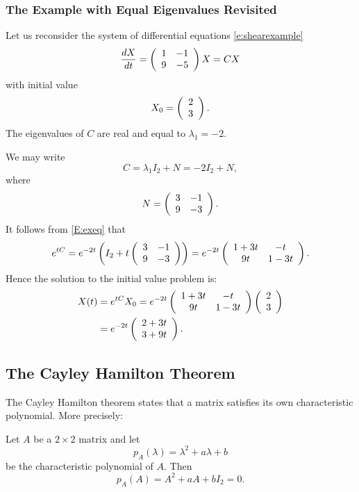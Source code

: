 \documentclass{ximera}
\begin{document}
\subsubsection*{The Example with Equal Eigenvalues Revisited}

Let us reconsider the system of differential equations \eqref{e:shearexample}
\[
\frac{dX}{dt} = \left(\begin{array}{rr} 1 & -1\\ 9 &-5\end{array}\right) X = CX
\]
with initial value
\[
X_0 = \left(\begin{array}{r} 2 \\ 3\end{array}\right).
\]
The eigenvalues of $C$ are real and equal to $\lambda_1=-2$.

We may write
\[
C = \lambda_1 I_2 + N = -2I_2+N,
\]
where
\[
N = \left(\begin{array}{rr} 3 & -1\\ 9 &-3\end{array}\right).
\]
It follows from \eqref{E:exeq} that
\begin{equation}  \label{e:solntob}
e^{tC} =  e^{-2t}\left(I_2+t\left(\begin{array}{rr} 3 & -1\\ 9 &-3\end{array}\right)\right)
= e^{-2t}\left(\begin{array}{cc} 1+3t & -t\\ 9t &1-3t\end{array}\right).
\end{equation}
Hence the solution to the initial value problem is:
\begin{align*}
X(t) &= e^{tC}X_0 = e^{-2t}\left(\begin{array}{cc} 1+3t & -t\\ 9t &1-3t\end{array}\right)\left(\begin{array}{r} 2 \\ 3\end{array}\right) \\
  &= e^{-2t}\left(\begin{array}{r} 2+3t \\ 3+9t\end{array}\right).
\end{align*}

\subsection*{The Cayley Hamilton Theorem} 

The Cayley Hamilton theorem states that a matrix satisfies its own
characteristic polynomial.  More precisely:
\begin{theorem} \label{T:CH2}
Let $A$ be a $2\times 2$ matrix and let
\[
p_A(\lambda) = \lambda^2 + a\lambda + b
\]
be the characteristic polynomial of $A$.  Then
\[
p_A(A) = A^2 + aA + bI_2 = 0.
\]
\end{theorem}
\end{document}
